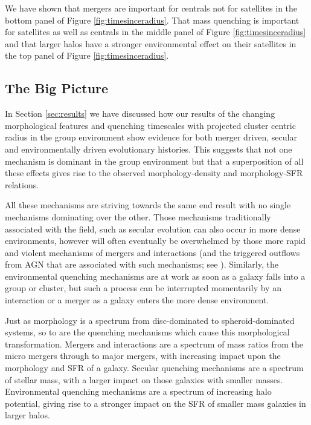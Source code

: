 \documentclass[useAMS,usenatbib]{mn2e}
\begin{document}
{We have shown that mergers are important for centrals not for satellites in the bottom panel of Figure \ref{fig:timesinceradius}. That mass quenching is important for satellites as well as centrals in the middle panel of Figure \ref{fig:timesinceradius} and that larger halos have a stronger environmental effect on their satellites in the top panel of Figure \ref{fig:timesinceradius}. 


\subsection{The Big Picture}\label{sec:bigpic}

In Section \ref{sec:results} we have discussed how our results of the changing morphological features and quenching timescales with projected cluster centric radius in the group environment show evidence for both merger driven, secular and environmentally driven evolutionary histories. This suggests that not one mechanism is dominant in the group environment but that a superposition of all these effects gives rise to the observed morphology-density and morphology-SFR relations.

All these mechanisms are striving towards the same end result with no single mechanisms dominating over the other. Those mechanisms traditionally associated with the field, such as secular evolution can also occur in more dense environments, however will often eventually be overwhelmed by those more rapid and violent mechanisms of mergers and interactions (and the triggered outflows from AGN that are associated with such mechanisms; see \citealt{smethurst16}). Similarly, the environmental quenching mechanisms are at work as soon as a galaxy falls into a group or cluster, but such a process can be interrupted momentarily by an interaction or a merger as a galaxy enters the more dense environment.   

Just as morphology is a spectrum from disc-dominated to spheroid-dominated systems, so to are the quenching mechanisms which cause this morphological transformation. Mergers and interactions are a spectrum of mass ratios from the micro mergers \citep{?} through to major mergers, with increasing impact upon the morphology and SFR of a galaxy. Secular quenching mechanisms are a spectrum of stellar mass, with a larger impact on those galaxies with smaller masses. Environmental quenching mechanisms are a spectrum of increasing halo potential, giving rise to a stronger impact on the SFR of smaller mass galaxies in larger halos.  

}
\end{document}
